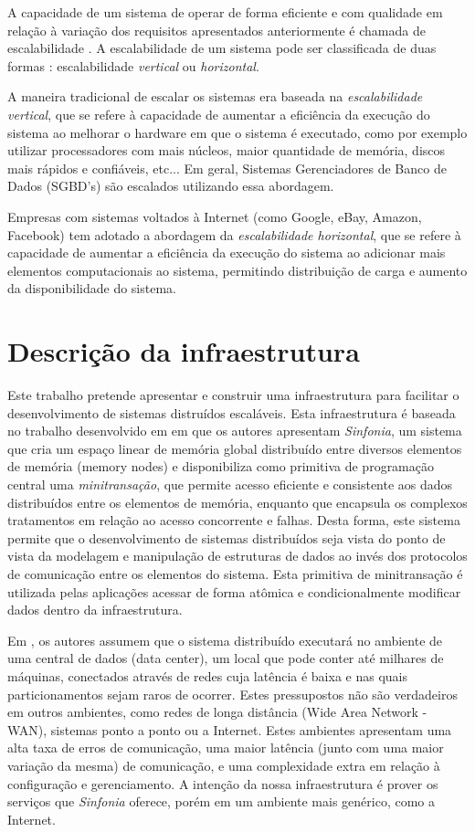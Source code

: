 \documentclass[a4paper,12pt]{report}
\begin{document}
A capacidade de um sistema de operar de forma eficiente e com qualidade em relação à variação dos requisitos apresentados anteriormente é chamada de escalabilidade \cite{evaluating-scalability}. A escalabilidade de um sistema pode ser classificada de duas formas \cite{scale-up-vs-down}: escalabilidade {\em vertical} ou {\em horizontal}.

A maneira tradicional de escalar os sistemas era baseada na {\em escalabilidade vertical}, que se refere à capacidade de aumentar a eficiência da execução do sistema ao melhorar o hardware em que o sistema é executado, como por exemplo utilizar processadores com mais núcleos, maior quantidade de memória, discos mais rápidos e confiáveis, etc... Em geral, Sistemas Gerenciadores de Banco de Dados (SGBD's) são escalados utilizando essa abordagem.

Empresas com sistemas voltados à Internet (como Google, eBay, Amazon, Facebook) tem adotado a abordagem da {\em escalabilidade horizontal}, que se refere à capacidade de aumentar a eficiência da execução do sistema ao adicionar mais elementos computacionais ao sistema, permitindo distribuição de carga e aumento da disponibilidade do sistema.

\chapter{Descrição da infraestrutura}
Este trabalho pretende apresentar e construir uma infraestrutura para facilitar o desenvolvimento de sistemas distruídos escaláveis. Esta infraestrutura é baseada no trabalho desenvolvido em \cite{sinfonia} em que os autores apresentam {\em Sinfonia}, um sistema que cria um espaço linear de memória global distribuído entre diversos elementos de memória (memory nodes) e disponibiliza como primitiva de programação central uma {\em minitransação}, que permite acesso eficiente e consistente aos dados distribuídos entre os elementos de memória, enquanto que encapsula os complexos tratamentos em relação ao acesso concorrente e falhas. Desta forma, este sistema permite que o desenvolvimento de sistemas distribuídos seja vista do ponto de vista da modelagem e manipulação de estruturas de dados ao invés dos protocolos de comunicação entre os elementos do sistema. Esta primitiva de minitransação é utilizada pelas aplicações acessar de forma atômica e condicionalmente modificar dados dentro da infraestrutura.

Em \cite{sinfonia}, os autores assumem que o sistema distribuído executará no ambiente de uma central de dados (data center), um local que pode conter até milhares de máquinas, conectados através de redes cuja latência é baixa e nas quais particionamentos sejam raros de ocorrer. Estes pressupostos não são verdadeiros em outros ambientes, como redes de longa distância (Wide Area Network - WAN), sistemas ponto a ponto ou a Internet. Estes ambientes apresentam uma alta taxa de erros de comunicação, uma maior latência (junto com uma maior variação da mesma) de comunicação, e uma complexidade extra em relação à configuração e gerenciamento. A intenção da nossa infraestrutura é prover os serviços que {\em Sinfonia} oferece, porém em um ambiente mais genérico, como a Internet. 
\end{document}
